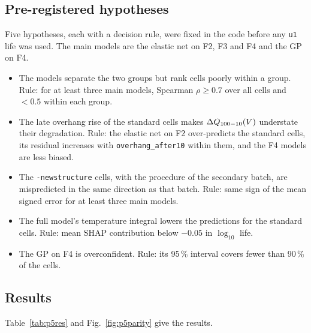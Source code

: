 \subsection{Pre-registered hypotheses}
Five hypotheses, each with a decision rule, were fixed in the code before any
\texttt{u1} life was used. The main models are the elastic net on F2, F3 and
F4 and the GP on F4.
\begin{itemize}
  \item[H1] The models separate the two groups but rank cells poorly within a
  group. Rule: for at least three main models, Spearman $\rho\ge0.7$ over all
  cells and $<0.5$ within each group.
  \item[H2] The late overhang rise of the standard cells makes $\Delta Q_{100-10}(V)$
  understate their degradation. Rule: the elastic net on F2 over-predicts the
  standard cells, its residual increases with \texttt{overhang\_after10} within
  them, and the F4 models are less biased.
  \item[H3] The \texttt{-newstructure} cells, with the procedure of the
  secondary batch, are mispredicted in the same direction as that batch.
  Rule: same sign of the mean signed error for at least three main models.
  \item[H4] The full model's temperature integral lowers the predictions for
  the standard cells. Rule: mean SHAP contribution below $-0.05$ in
  $\log_{10}$ life.
  \item[H5] The GP on F4 is overconfident. Rule: its 95\,\% interval covers
  fewer than 90\,\% of the cells.
\end{itemize}

\subsection{Results}
Table~\ref{tab:p5res} and Fig.~\ref{fig:p5parity} give the results.

